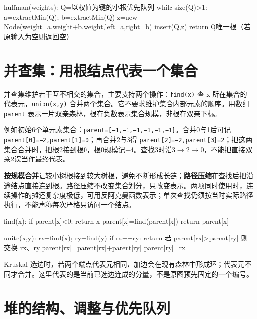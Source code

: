\begin{codeblock}[language={}]
huffman(weights):
    Q=以权值为键的小根优先队列
    while size(Q)>1:
        a=extractMin(Q); b=extractMin(Q)
        z=new Node(weight=a.weight+b.weight,left=a,right=b)
        insert(Q,z)
    return Q唯一根（若原输入为空则返回空）
\end{codeblock}

\section{并查集：用根结点代表一个集合}\label{DS05-10}

并查集维护若干互不相交的集合，主要支持两个操作：\texttt{find(\allowbreak{}x)\allowbreak{}} 查 x 所在集合的代表元，\texttt{union(\allowbreak{}x,\allowbreak{}y)\allowbreak{}} 合并两个集合。它不要求维护集合内部元素的顺序。用数组 \texttt{parent} 表示一片双亲森林，根存负数表示集合规模，非根存双亲下标。

例如初始6个单元素集合：\texttt{parent=\allowbreak{}[−1,\allowbreak{}−1,\allowbreak{}−1,\allowbreak{}−1,\allowbreak{}−1,\allowbreak{}−1]}。合并0与1后可记 \texttt{parent[0]=\allowbreak{}−2,\allowbreak{}parent[1]=\allowbreak{}0}；再合并2与3得 \texttt{parent[2]=\allowbreak{}−2,\allowbreak{}parent[3]=\allowbreak{}2}；把这两集合合并时，把根2接到根0，根0规模记\ensuremath{-}4。查找3时沿3\ensuremath{\to}2\ensuremath{\to}0，不能把直接双亲2误当作最终代表。

\textbf{按规模合并}让较小树根接到较大树根，避免不断形成长链；\textbf{路径压缩}在查找后把沿途结点直接连到根。路径压缩不改变集合划分，只改变表示。两项同时使用时，连续操作的摊还复杂度极低，可用反阿克曼函数表示；单次查找仍须按当时实际路径执行，不能声称每次严格只访问一个结点。

\begin{codeblock}[language={}]
find(x):
    if parent[x]<0: return x
    parent[x]=find(parent[x])
    return parent[x]

unite(x,y):
    rx=find(x); ry=find(y)
    if rx==ry: return
    若 parent[rx]>parent[ry] 则交换 rx、ry
    parent[rx]=parent[rx]+parent[ry]
    parent[ry]=rx
\end{codeblock}

Kruskal 选边时，若两个端点代表元相同，加边会在现有森林中形成环；代表元不同才合并。这里代表的是当前已选边连成的分量，不是原图预先固定的一个编号。

\section{堆的结构、调整与优先队列}\label{DS05-11}

